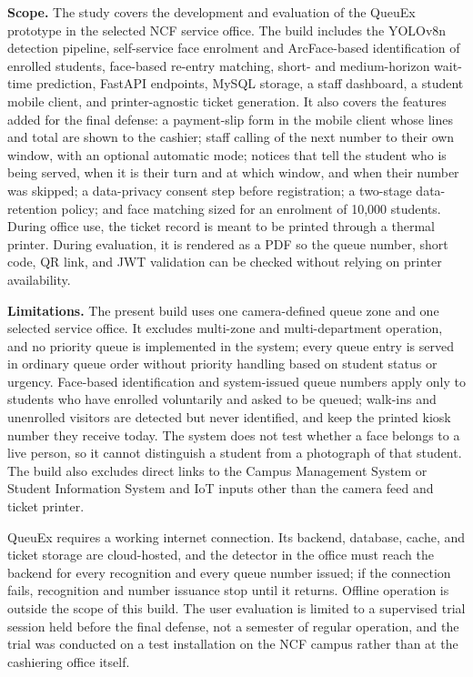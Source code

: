 \documentclass{research}
\newcommand{\sysname}{QueuEx}
\begin{document}
\textbf{Scope.} The study covers the development and evaluation of the
\sysname{} prototype in the selected NCF service office. The build
includes the YOLOv8n detection pipeline, self-service face enrolment and
ArcFace-based identification of enrolled students, face-based re-entry
matching, short- and medium-horizon wait-time prediction, FastAPI
endpoints, MySQL storage, a staff dashboard, a student mobile client, and
printer-agnostic ticket generation. It also covers the features added for
the final defense: a payment-slip form in the mobile client whose lines
and total are shown to the cashier; staff calling of the next number to
their own window, with an optional automatic mode; notices that tell the
student who is being served, when it is their turn and at which window,
and when their number was skipped; a data-privacy consent step before
registration; a two-stage data-retention policy; and face matching sized
for an enrolment of 10,000 students. During office use, the ticket record
is meant to be printed through a thermal printer. During evaluation, it
is rendered as a PDF so the queue number, short code, QR link, and JWT
validation can be checked without relying on printer availability.

\textbf{Limitations.} The present build uses one camera-defined queue
zone and one selected service office. It excludes multi-zone and
multi-department operation, and no priority queue is implemented in the
system; every queue entry is served in ordinary queue order without
priority handling based on student status or urgency. Face-based
identification and system-issued queue numbers apply only to students
who have enrolled voluntarily and asked to be queued; walk-ins and
unenrolled visitors are detected but never identified, and keep the
printed kiosk number they receive today. The system does not test
whether a face belongs to a live person, so it cannot distinguish a
student from a photograph of that student. The build also excludes
direct links to the Campus Management System or Student Information
System and IoT inputs other than the camera feed and ticket printer.

\sysname{} requires a working internet connection. Its backend,
database, cache, and ticket storage are cloud-hosted, and the detector
in the office must reach the backend for every recognition and every
queue number issued; if the connection fails, recognition and number
issuance stop until it returns. Offline operation is outside the scope
of this build. The user evaluation is limited to a supervised
trial session held before the final defense, not a semester of regular
operation, and the trial was conducted on a test installation on the
NCF campus rather
than at the cashiering office itself.
\end{document}
